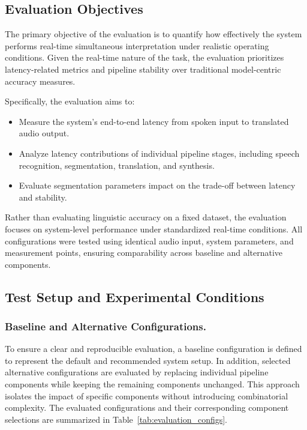 \subsection{Evaluation Objectives}

The primary objective of the evaluation is to quantify how effectively the system performs real-time simultaneous interpretation under realistic operating conditions. Given the real-time nature of the task, the evaluation prioritizes latency-related metrics and pipeline stability over traditional model-centric accuracy measures.

Specifically, the evaluation aims to:
\begin{itemize}
  \item Measure the system's end-to-end latency from spoken input to translated audio output.
  \item Analyze latency contributions of individual pipeline stages, including speech recognition, segmentation, translation, and synthesis.
  \item Evaluate segmentation parameters impact on the trade-off between latency and stability.
\end{itemize}

Rather than evaluating linguistic accuracy on a fixed dataset, the evaluation focuses on system-level performance under standardized real-time conditions. All configurations were tested using identical audio input, system parameters, and measurement points, ensuring comparability across baseline and alternative components.

\subsection{Test Setup and Experimental Conditions}

\subsubsection{Baseline and Alternative Configurations.}
To ensure a clear and reproducible evaluation, a baseline configuration is defined to represent the default and recommended system setup. In addition, selected alternative configurations are evaluated by replacing individual pipeline components while keeping the remaining components unchanged. This approach isolates the impact of specific components without introducing combinatorial complexity. The evaluated configurations and their corresponding component selections are summarized in Table~\ref{tab:evaluation_configs}.

